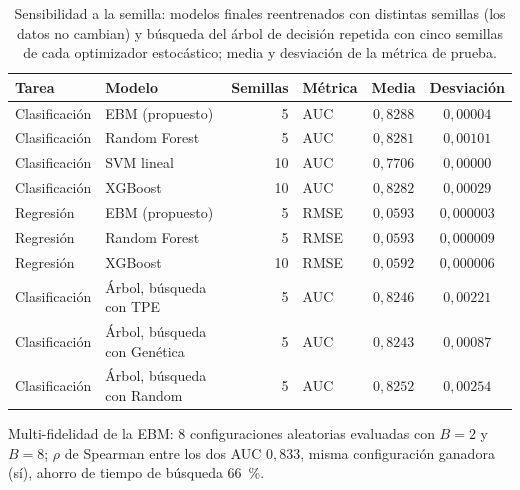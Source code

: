 \begin{table}[tbp]
  \centering\scriptsize\setlength{\tabcolsep}{3pt}
  \caption{Sensibilidad a la semilla: modelos finales reentrenados con distintas semillas (los datos no cambian) y búsqueda del árbol de decisión repetida con cinco semillas de cada optimizador estocástico; media y desviación de la métrica de prueba.}
  \label{tab:semillas}
  \begin{tabular}{@{}l l r l c c@{}}
    \toprule
    Tarea & Modelo & Semillas & Métrica & Media & Desviación \\
    \midrule
    Clasificación & EBM (propuesto) & 5 & AUC & $0{,}8288$ & $0{,}00004$ \\
    Clasificación & Random Forest & 5 & AUC & $0{,}8281$ & $0{,}00101$ \\
    Clasificación & SVM lineal & 10 & AUC & $0{,}7706$ & $0{,}00000$ \\
    Clasificación & XGBoost & 10 & AUC & $0{,}8282$ & $0{,}00029$ \\
    Regresión & EBM (propuesto) & 5 & RMSE & $0{,}0593$ & $0{,}000003$ \\
    Regresión & Random Forest & 5 & RMSE & $0{,}0593$ & $0{,}000009$ \\
    Regresión & XGBoost & 10 & RMSE & $0{,}0592$ & $0{,}000006$ \\
    Clasificación & Árbol, búsqueda con TPE & 5 & AUC & $0{,}8246$ & $0{,}00221$ \\
    Clasificación & Árbol, búsqueda con Genética & 5 & AUC & $0{,}8243$ & $0{,}00087$ \\
    Clasificación & Árbol, búsqueda con Random & 5 & AUC & $0{,}8252$ & $0{,}00254$ \\
    \bottomrule
  \end{tabular}
  \par\smallskip\begin{minipage}{0.97\linewidth}\scriptsize Multi-fidelidad de la EBM: 8 configuraciones aleatorias evaluadas con $B=2$ y $B=8$; $\rho$ de Spearman entre los dos AUC $0{,}833$, misma configuración ganadora (sí), ahorro de tiempo de búsqueda $66$~\%.\end{minipage}
\end{table}
